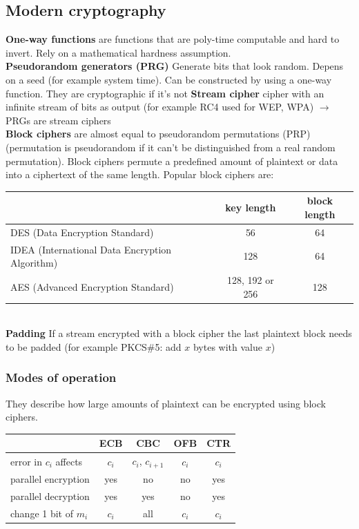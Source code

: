 \documentclass[12pt]{article}
\begin{document}
	\subsection{Modern cryptography}
	\textbf{One-way functions} are functions that are poly-time computable and hard to invert. Rely on a mathematical hardness assumption.\\
	\textbf{Pseudorandom generators (PRG)} Generate bits that look random. Depens on a seed (for example system time). Can be constructed by using a one-way function. They are cryptographic if it's not %
	\textbf{Stream cipher} cipher with an infinite stream of bits as output (for example RC4 used for WEP, WPA) $\rightarrow$ PRGs are stream ciphers\\
	\textbf{Block ciphers} are almost equal to pseudorandom permutations (PRP) (permutation is pseudorandom if it can't be distinguished from a real random permutation). Block ciphers permute a predefined amount of plaintext or data into a ciphertext of the same length. Popular block ciphers are:\\
	\begin{tabular}{|l|c|c|}
		\hline 
		& \textbf{key length} & \textbf{block length} \\ 
		\hline 
		DES (Data Encryption Standard) & 56 & 64 \\ 
		\hline 
		IDEA (International Data Encryption Algorithm) & 128 & 64 \\ 
		\hline 
		AES (Advanced Encryption Standard) & 128, 192 or 256 & 128 \\ 
		\hline 
	\end{tabular}\\
	\textbf{Padding} If a stream encrypted with a block cipher the last plaintext block needs to be padded (for example PKCS\#5: add $x$ bytes with value $x$)
	
	\subsubsection{Modes of operation}
	They describe how large amounts of plaintext can be encrypted using block ciphers.\\
	\begin{tabular}{|l|c|c|c|c|}
		\hline 
		& ECB & CBC & OFB & CTR \\ 
		\hline 
		error in $c_i$ affects & $c_i$ & $c_i$, $c_{i+1}$ & $c_i$ & $c_i$ \\ 
		\hline 
		parallel encryption & yes & no & no & yes \\ 
		\hline 
		parallel decryption & yes & yes & no & yes \\ 
		\hline 
		change 1 bit of $m_i$ & $c_i$ & all & $c_i$ & $c_i$ \\ 
		\hline 
	\end{tabular}
\end{document}
